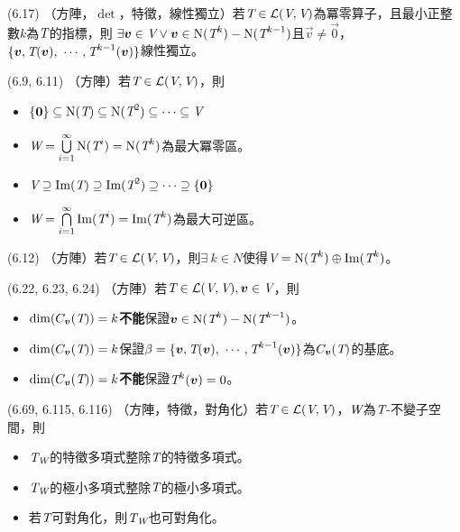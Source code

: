 \item \begin{theorem}{(6.17)} （方陣，$\det$，特徵，線性獨立）若$\T \in \L(\V, \V)$為冪零算子，且最小正整數$k$為$\T$的指標，則
	$\exists \vec{v} \in \V \lor \vec{v} \in \Ker(\T^k) - \Ker(\T^{k - 1})$且$\vec{v} \neq \vec{0}$，
	$\{\vec{v}, \T(\vec{v}), \ \cdots, \T^{k - 1}(\vec{v})\}$線性獨立。
\end{theorem}

\item \begin{theorem}{(6.9, 6.11)} （方陣）若$\T \in \L(\V, \V)$，則
	\begin{itemize}
		\item $\{\vec{0}\} \subseteq \Ker(\T) \subseteq \Ker(\T^2) \subseteq \cdots \subseteq \V$
		\item $\spc{W} = \bigcup\limits_{i = 1}^{\infty} \Ker(\T^i) = \Ker(\T^k)$為最大冪零區。
		\item $\V \supseteq \im(\T) \supseteq \im(\T^2) \supseteq \cdots \supseteq \{\vec{0}\}$
		\item $\spc{W} = \bigcap\limits_{i = 1}^{\infty} \im(\T^i) = \im(\T^k)$為最大可逆區。
	\end{itemize}
\end{theorem}

\item \begin{theorem}{(6.12)} （方陣）若$\T \in \L(\V, \V)$，則$\exists \ k \in N$使得$\V = \Ker(\T^k) \oplus \im(\T^k)$。
\end{theorem}

\item \begin{theorem}{(6.22, 6.23, 6.24)} （方陣）若$\T \in \L(\V, \V), \vec{v} \in \V$，則
	\begin{itemize}
		\item $\dim(C_{\vec{v}}(\T)) = k$\textbf{不能}保證$\vec{v} \in \Ker(\T^k) - \Ker(\T^{k - 1})$。
		\item $\dim(C_{\vec{v}}(\T)) = k$保證$\beta = \{\vec{v}, \T(\vec{v}), \ \cdots, \T^{k - 1}(\vec{v})\}$為$C_{\vec{v}}(\T)$的基底。
		\item $\dim(C_{\vec{v}}(\T)) = k$\textbf{不能}保證$\T^k(\vec{v}) = 0$。
	\end{itemize}
\end{theorem}

\item \begin{theorem}{(6.69, 6.115, 6.116)} （方陣，特徵，對角化）若$\T \in \L(\V, \V)$，$\spc{W}$為$\T$-不變子空間，則
	\begin{itemize}
		\item $\T_\spc{W}$的特徵多項式整除$\T$的特徵多項式。
		\item $\T_\spc{W}$的極小多項式整除$\T$的極小多項式。
		\item 若$\T$可對角化，則$\T_{\spc{W}}$也可對角化。
	\end{itemize}
\end{theorem}

